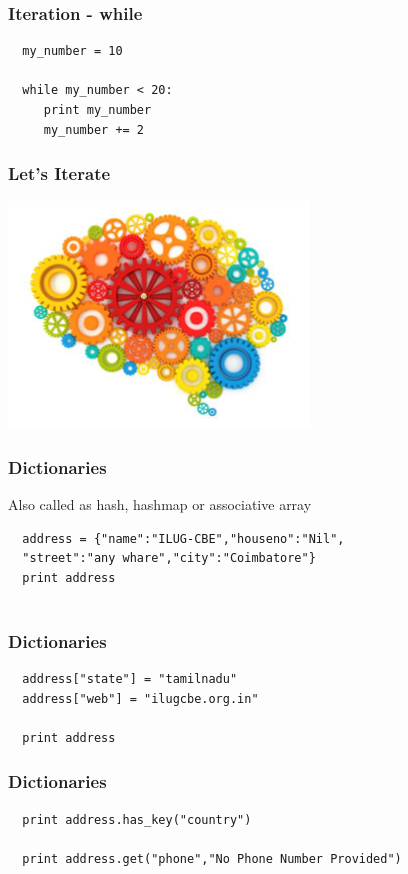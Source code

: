 \documentclass{beamer}
\begin{document}
\begin{frame}[fragile]
 \frametitle{Iteration - while}
 \begin{verbatim}
  my_number = 10
  
  while my_number < 20:
     print my_number
     my_number += 2
 \end{verbatim}

\end{frame}


\begin{frame}[fragile]
 \frametitle{Let's Iterate}
 \begin{center}
  \includegraphics[height=6cm]{iter.jpg}
 \end{center}

\end{frame}

\begin{frame}[fragile]
 \frametitle{Dictionaries}
 Also called as hash, hashmap or associative array
 \begin{verbatim}
  address = {"name":"ILUG-CBE","houseno":"Nil",
  "street":"any whare","city":"Coimbatore"}
  print address
  
 \end{verbatim}

\end{frame}

\begin{frame}[fragile]
 \frametitle{Dictionaries}
 \begin{verbatim}
  address["state"] = "tamilnadu"
  address["web"] = "ilugcbe.org.in"
  
  print address
 \end{verbatim}

\end{frame}

\begin{frame}[fragile]
 \frametitle{Dictionaries}
 \begin{verbatim}
  print address.has_key("country")
  
  print address.get("phone","No Phone Number Provided")
 \end{verbatim}

\end{frame}
\end{document}
